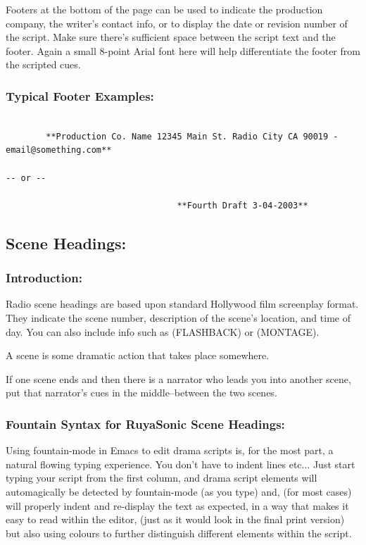 \documentclass[openleft,oneside,showtrims]{memoir}
\begin{document}
Footers at the bottom of the page can be used to indicate the production company, the writer's contact info, or to display the date or revision number of the script. Make sure there's sufficient space between the script text and the footer. Again a small 8-point Arial font here will help differentiate the footer from the scripted cues.

\subsubsection*{Typical Footer Examples:}
\label{sec:org7c41146}

\lstset{language=fountain,label= ,caption= ,captionpos=b,numbers=none}
\begin{lstlisting}

        **Production Co. Name 12345 Main St. Radio City CA 90019 - email@something.com**

-- or --

                                  **Fourth Draft 3-04-2003**

\end{lstlisting}

\subsection{Scene Headings:}
\label{sec:org612b0cb}
\subsubsection*{Introduction:}
\label{sec:orgcd592a5}

Radio scene headings are based upon standard Hollywood film screenplay format. They indicate the scene number, description of the scene's location, and time of day. You can also include info such as (FLASHBACK) or (MONTAGE).

A scene is some dramatic action that takes place somewhere.

If one scene ends and then there is a narrator who leads you into another scene, put that narrator's cues in the middle--between the two scenes.

\subsubsection*{Fountain Syntax for RuyaSonic Scene Headings:}
\label{sec:org7574f3e}

Using fountain-mode in Emacs to edit drama scripts is, for the most part, a natural flowing typing experience.  You don't have to indent lines etc... Just start typing your script from the first column, and drama script elements will automagically be detected by fountain-mode (as you type) and, (for most cases) will properly indent and re-display the text as expected, in a way that makes it easy to read within the editor, (just as it would look in the final print version) but also using colours to further distinguish different elements within the script.
\end{document}
